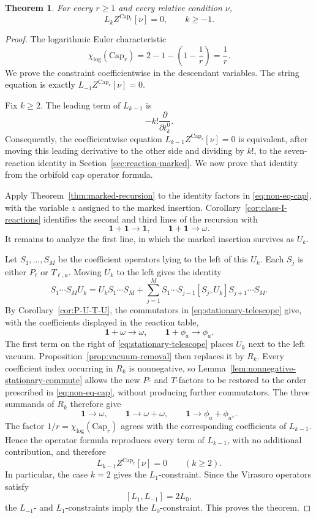 \documentclass[letterpaper,12pt]{amsart}
\newtheorem{thm}{Theorem}[section]
\theoremstyle{definition}
\newcommand{\id}{\mathbf 1}
\newcommand{\OrbCap}{\mathrm{Cap}}
\numberwithin{equation}{section}
\begin{document}
\begin{thm}\label{thm:cap-virasoro}
For every \(r\ge1\) and every relative condition \(\nu\),
\[
  L_kZ^{\OrbCap_r}[\nu]=0,
  \qquad k\ge -1.
\]
\end{thm}
\begin{proof}
The logarithmic Euler characteristic 
\[
  \chi_{\log}(\OrbCap_r)
  =
  2-1-\left(1-\frac1r\right)
  =
  \frac1r.
\]
We prove the constraint coefficientwise in the descendant variables.  The
string equation is exactly \(L_{-1}Z^{\OrbCap_r}[\nu]=0\).

Fix \(k\ge2\).  The leading term of \(L_{k-1}\) is
\[
  -k!\frac{\partial}{\partial t_k^0}.
\]
Consequently, the coefficientwise equation
\(L_{k-1}Z^{\OrbCap_r}[\nu]=0\) is equivalent, after moving this leading
derivative to the other side and dividing by \(k!\), to the seven-reaction
identity in Section~\ref{sec:reaction-marked}.  We now prove that identity
from the orbifold cap operator formula.

Apply Theorem~\ref{thm:marked-recursion} to the identity factors in
\eqref{eq:non-eq-cap}, with the variable \(z\) assigned to the marked
insertion.  Corollary~\ref{cor:class-I-reactions} identifies the second and
third lines of the recursion with
\[
  \id+\id\longrightarrow\id,
  \qquad
  \id+\id\longrightarrow\omega.
\]
It remains to analyze the first line, in which the marked insertion survives
as \(U_k\).

Let \(S_1,\ldots,S_M\) be the coefficient operators lying to the left of
this \(U_k\).  Each \(S_j\) is either \(P_\ell\) or \(T_{\ell,a}\).  Moving
\(U_k\) to the left gives the identity
\begin{equation}\label{eq:stationary-telescope}
  S_1\cdots S_MU_k
  =
  U_kS_1\cdots S_M
  +
  \sum_{j=1}^{M}
  S_1\cdots S_{j-1}[S_j,U_k]S_{j+1}\cdots S_M.
\end{equation}
By Corollary~\ref{cor:P-U-T-U}, the commutators in
\eqref{eq:stationary-telescope} give, with the coefficients displayed in
the reaction table,
\[
  \id+\omega\longrightarrow\omega,
  \qquad
  \id+\phi_a\longrightarrow\phi_a.
\]
The first term on the right of \eqref{eq:stationary-telescope} places
\(U_k\) next to the left vacuum.  Proposition~\ref{prop:vacuum-removal}
then replaces it by \(R_k\).  Every coefficient index occurring in \(R_k\)
is nonnegative, so Lemma~\ref{lem:nonnegative-stationary-commute} allows
the new \(P\)- and \(T\)-factors to be restored to the order prescribed in
\eqref{eq:non-eq-cap}, without producing further commutators.  The three
summands of \(R_k\) therefore give
\[
  \id\longrightarrow\omega,
  \qquad
  \id\longrightarrow\omega+\omega,
  \qquad
  \id\longrightarrow\phi_a+\phi_{a^\vee}.
\]
The factor \(1/r=\chi_{\log}(\OrbCap_r)\) agrees with the corresponding
coefficients of \(L_{k-1}\).  Hence the operator formula reproduces every
term of \(L_{k-1}\), with no additional contribution, and therefore
\[
  L_{k-1}Z^{\OrbCap_r}[\nu]=0
  \qquad(k\ge2).
\]
In particular, the case \(k=2\) gives the \(L_1\)-constraint.  Since the
Virasoro operators satisfy
\[
  [L_1,L_{-1}]=2L_0,
\]
the \(L_{-1}\)- and \(L_1\)-constraints imply the \(L_0\)-constraint.
This proves the theorem.
\end{proof}
\end{document}

